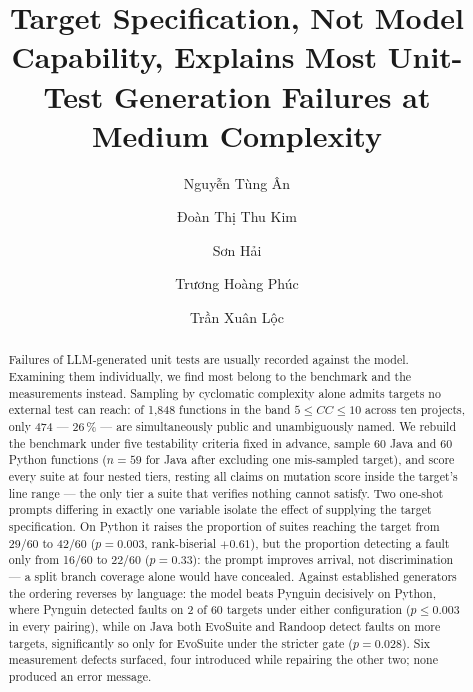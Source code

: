 \documentclass[a4paper]{llncs}
\begin{document}
\title{Target Specification, Not Model Capability, Explains Most
Unit-Test Generation Failures at Medium Complexity}

\author{Nguyễn Tùng Ân \and Đoàn Thị Thu Kim \and Sơn Hải \and
Trương Hoàng Phúc \and Trần Xuân Lộc}



\maketitle

\begin{abstract}
Failures of LLM-generated unit tests are usually recorded against the model. Examining
them individually, we find most belong to the benchmark and the measurements instead.
Sampling by cyclomatic complexity alone admits targets no external test can reach: of
1{,}848 functions in the band $5 \le CC \le 10$ across ten projects, only 474 ---
26\,\% --- are simultaneously public and unambiguously named. We rebuild the benchmark
under five testability criteria fixed in advance, sample 60 Java and 60 Python functions
($n = 59$ for Java after excluding one mis-sampled target), and score every suite at four
nested tiers, resting all claims on mutation score inside the target's line range --- the
only tier a suite that verifies nothing cannot satisfy. Two one-shot prompts differing in
exactly one variable isolate the effect of supplying the target specification. On Python
it raises the proportion of suites reaching the target from 29/60 to 42/60
($p = 0.003$, rank-biserial $+0.61$), but the proportion detecting a fault only from
16/60 to 22/60 ($p = 0.33$): the prompt improves arrival, not discrimination --- a split
branch coverage alone would have concealed. Against established generators the ordering
reverses by language: the model beats Pynguin decisively on Python, where Pynguin detected
faults on 2 of 60 targets under either configuration ($p \le 0.003$ in every pairing),
while on Java both EvoSuite and Randoop detect faults on more targets, significantly so
only for EvoSuite under the stricter gate ($p = 0.028$). Six measurement defects surfaced,
four introduced while repairing the other two; none produced an error message.

\end{abstract}











\end{document}
